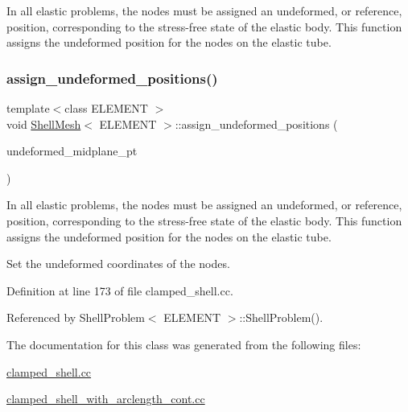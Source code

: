 In all elastic problems, the nodes must be assigned an undeformed, or reference, position, corresponding to the stress-\/free state of the elastic body. This function assigns the undeformed position for the nodes on the elastic tube. 

\mbox{\label{classShellMesh_a3576870121fad30d0f99588ea8082ca1}} 
\subsubsection{\texorpdfstring{assign\+\_\+undeformed\+\_\+positions()}{assign\_undeformed\_positions()}\hspace{0.1cm}{\footnotesize\ttfamily [2/2]}}
{\footnotesize\ttfamily template$<$class E\+L\+E\+M\+E\+NT $>$ \\
void \hyperlink{classShellMesh}{Shell\+Mesh}$<$ E\+L\+E\+M\+E\+NT $>$\+::assign\+\_\+undeformed\+\_\+positions (\begin{DoxyParamCaption}\item[{Geom\+Object $\ast$const \&}]{undeformed\+\_\+midplane\+\_\+pt }\end{DoxyParamCaption})}



In all elastic problems, the nodes must be assigned an undeformed, or reference, position, corresponding to the stress-\/free state of the elastic body. This function assigns the undeformed position for the nodes on the elastic tube. 

Set the undeformed coordinates of the nodes. 

Definition at line 173 of file clamped\+\_\+shell.\+cc.



Referenced by Shell\+Problem$<$ E\+L\+E\+M\+E\+N\+T $>$\+::\+Shell\+Problem().



The documentation for this class was generated from the following files\+:\begin{DoxyCompactItemize}
\item 
\hyperlink{clamped__shell_8cc}{clamped\+\_\+shell.\+cc}\item 
\hyperlink{clamped__shell__with__arclength__cont_8cc}{clamped\+\_\+shell\+\_\+with\+\_\+arclength\+\_\+cont.\+cc}\end{DoxyCompactItemize}

